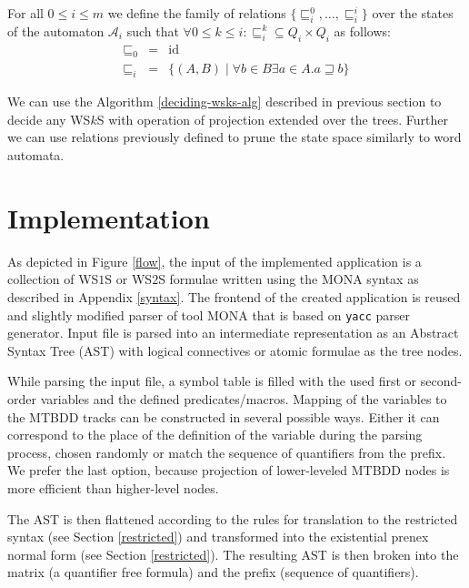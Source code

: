 \begin{defz}
For all $0 \leq i \leq m$ we define the family of relations
$\{\sqsubseteq_i^0,\ldots,\sqsubseteq^i_i\}$ over the states of the automaton
$\mathcal{A}_i$ such that $\forall 0 \leq k \leq i: \sqsubseteq_i^k\subseteq Q_i
\times Q_i$ as follows:
\begin{eqnarray}
 \sqsubseteq_0 & = & \text{id}\\
 \sqsubseteq_i & = & \{(A, B) \mid \forall b \in B \exists a \in A. a
 \sqsupseteq b\}
\end{eqnarray}
\end{defz}

We can use the Algorithm \ref{deciding-wsks-alg} described in previous section
to decide any WS$k$S with operation of projection extended over the trees.
Further we can use relations previously defined to prune the state space
similarly to word automata.

\chapter{Implementation}

As depicted in Figure \ref{flow}, the input of the implemented application is
a collection of WS$1$S or WS$2$S formulae written using the \textsc{MONA}
syntax as described in Appendix \ref{syntax}. The frontend of the
created application is reused and slightly modified parser of tool \textsc{MONA}
that is based on \texttt{yacc} \cite{yacc} parser generator. Input file is
parsed into an intermediate representation as an Abstract Syntax
Tree (AST) with logical connectives or atomic formulae as the
tree nodes.

While parsing the input file, a symbol table is filled with the used
first or second-order variables and the defined predicates/macros. Mapping of
the variables to the MTBDD tracks can be constructed in several possible ways.
Either it can correspond to the place of the definition of the variable during
the parsing process, chosen randomly or match the sequence of quantifiers from
the prefix. We prefer the last option, because projection of lower-leveled MTBDD
nodes is more efficient than higher-level nodes.

The AST is then flattened according to the rules for translation to
the restricted syntax (see Section \ref{restricted}) and transformed into
the existential prenex normal form (see Section \ref{restricted}). The resulting
AST is then broken into the matrix (a quantifier free formula) and the
prefix (sequence of quantifiers).

